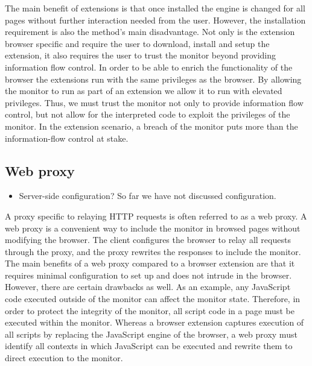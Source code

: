 \documentclass{llncs}
\begin{document}
The main benefit of extensions is that once installed the engine is changed for
all pages without further interaction needed from the user. However, the
installation requirement is also the method's main disadvantage. Not only is
the extension browser specific and require the user to download, install and
setup the extension, it also requires the user to trust the monitor beyond
providing information flow control. In order to be able to enrich the
functionality of the browser the extensions run with the same privileges as the
browser. By allowing the monitor to run as part of an extension we allow it to
run with elevated privileges. Thus, we must trust the monitor not only to
provide information flow control, but not allow for the interpreted code to
exploit the privileges of the monitor. In the extension scenario, a breach of
the monitor puts more than the information-flow control at stake.


\subsection{Web proxy}

\begin{itemize}
\item Server-side configuration? So far we have not discussed configuration.
\end{itemize}

A proxy specific to relaying HTTP requests is often referred to as a web proxy.
A web proxy is a convenient way to include the monitor in browsed pages without 
modifying the browser. The client configures the browser to relay 
all requests through the proxy, and the proxy rewrites the responses to include 
the monitor. The main benefits of a web proxy compared to a browser 
extension are that it requires 
minimal configuration to set up and does not intrude in the browser. However, there 
are certain drawbacks as well. 
%
As an example, any JavaScript code executed outside of the monitor can affect 
the monitor state. Therefore, in order to protect the integrity of the monitor, all 
script code in a page must be executed within the monitor. Whereas a 
browser extension captures execution of all scripts by replacing the JavaScript 
engine of the browser, a web proxy must identify all contexts in which JavaScript 
can be executed and rewrite them to direct execution to the monitor.
\end{document}

